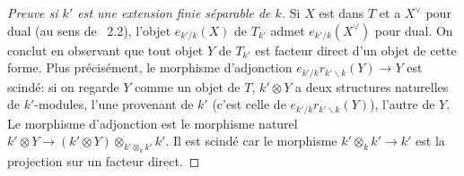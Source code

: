 \documentclass[11pt,a4paper]{article}
\theoremstyle{plain}
\theoremstyle{definition}
\begin{document}
\begin{proof}[Preuve si $k'$ est une extension finie s\'eparable de $k$]
Si $X$ est dans $T$ et a $X^\vee$ pour dual (au sens de \cite{Deligne1990}~2.2), l'objet $e_{k'/k}(X)$ de $T_{k'}$ admet $e_{k'/k}(X^\vee)$ pour dual. On conclut en observant que tout objet $Y$ de $T_{k'}$ est facteur direct d'un objet de cette forme. Plus pr\'ecis\'ement, le morphisme d'adjonction $e_{k'/k} r_{k' \backslash k}(Y) \to Y$ est scind\'e: si on regarde $Y$ comme un objet de $T$, $k' \otimes Y$ a deux structures naturelles de $k'$-modules, l'une provenant de $k'$ (c'est celle de $e_{k'/k} r_{k' \backslash k}(Y)$), l'autre de $Y$. Le morphisme d'adjonction est le morphisme naturel $k' \otimes Y \to (k' \otimes Y) \otimes_{k' \otimes_k k'} k'$. Il est scind\'e car le morphisme $k' \otimes_k k' \to k'$ est la projection sur un facteur direct.
\end{proof}
\end{document}
